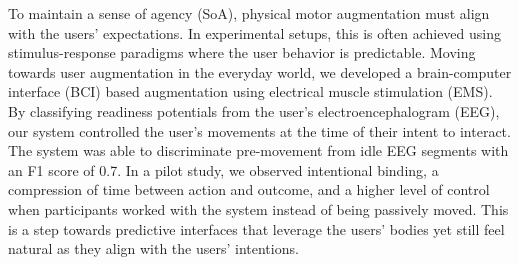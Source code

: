 To maintain a sense of agency (SoA), physical motor augmentation must align with the users' expectations. In experimental setups, this is often achieved using stimulus-response paradigms where the user behavior is predictable. Moving towards user augmentation in the everyday world, we developed a brain-computer interface (BCI) based augmentation using electrical muscle stimulation (EMS). By classifying readiness potentials from the user's electroencephalogram (EEG), our system controlled the user's movements at the time of their intent to interact. The system was able to discriminate pre-movement from idle EEG segments with an F1 score of 0.7. In a pilot study, we observed intentional binding, a compression of time between action and outcome, and a higher level of control when participants worked with the system instead of being passively moved. This is a step towards predictive interfaces that leverage the users’ bodies yet still feel natural as they align with the users’ intentions.

